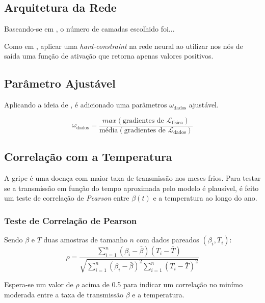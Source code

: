 \subsection{Arquitetura da Rede}

Baseando-se em \cite{shaier-etal:22-dinns}, o número de camadas escolhido foi...

Como em \cite{millevoi-etal:24-split-join-pinns}, aplicar uma 
\textit{hard-constraint} na rede neural ao utilizar nos nós de saída
uma função de ativação que retorna apenas valores positivos.

\subsection{Parâmetro  Ajustável}

Aplicando a ideia de \cite{shamsara-etal:25-omicron}, é adicionado uma parâmetros
$\omega_{\text{dados}}$ ajustável. 

\begin{equation}\label{eq:lambda-aprendivel}
    \omega_{\text{dados}} = \frac{max(\text{gradientes de }\mathcal{L}_{\text{física}})}{\text{média}(\text{gradientes de }\mathcal{L}_{\text{dados}})}
\end{equation}

\subsection{Correlação com a Temperatura}

A gripe é uma doença com maior taxa de transmissão nos meses frios. 
Para testar se a transmissão em função do tempo aproximada pelo modelo é plausível,
é feito um teste de correlação de \textit{Pearson} entre $\beta(t)$ e a temperatura
ao longo do ano.

\subsubsection{Teste de Correlação de Pearson}

Sendo $\beta$ e $T$ duas amostras de tamanho $n$ com dados pareados $(\beta_i, T_i)$:
\begin{equation}\label{correlacao-de-pearson}
\rho = \frac{\sum_{i=1}^{n} (\beta_i - \bar{\beta})(T_i - \bar{T})}{\sqrt{\sum_{i=1}^{n} (\beta_i - \bar{\beta})^2 \sum_{i=1}^{n} (T_i - \bar{T})^2}}
\end{equation}

Espera-se um valor de $\rho$ acima de 0.5 para indicar um correlação no minímo moderada
entre a taxa de transmissão $\beta$ e a temperatura.

